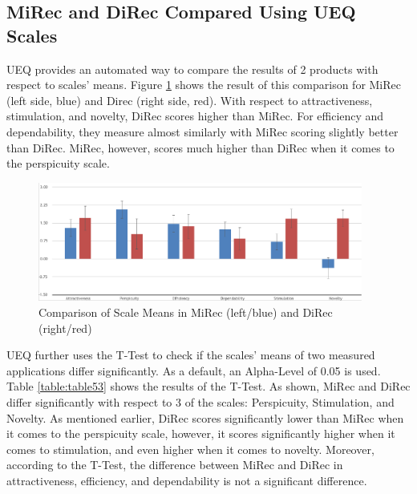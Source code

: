 \subsection{MiRec and DiRec Compared Using UEQ Scales}
UEQ provides an automated way to compare the results of 2 products with respect
to scales' means. Figure \ref{fig:figure53} shows the result of this comparison
for MiRec (left side, blue) and Direc (right side, red). With respect to
attractiveness, stimulation, and novelty, DiRec scores higher than MiRec. For
efficiency and dependability, they measure almost similarly with MiRec scoring
slightly better than DiRec. MiRec, however, scores much higher than DiRec when
it comes to the perspicuity scale.
\begin{figure}[!htbp]
\centering
\includegraphics[width=0.95\textwidth]{figures/compare}
\caption{Comparison of Scale Means in MiRec (left/blue) and DiRec (right/red)}
\label{fig:figure53}
\end{figure}

UEQ further uses the T-Test to check if the scales' means of two measured
applications differ significantly. As a default, an Alpha-Level of 0.05 is used.
Table \ref{table:table53} shows the results of the T-Test. As shown, MiRec and
DiRec differ significantly with respect to 3 of the scales: Perspicuity,
Stimulation, and Novelty. As mentioned earlier, DiRec scores significantly lower
than MiRec when it comes to the perspicuity scale, however, it scores
significantly higher when it comes to stimulation, and even higher when it
comes to novelty. Moreover, according to the T-Test, the difference between
MiRec and DiRec in attractiveness, efficiency, and dependability is not a
significant difference.

